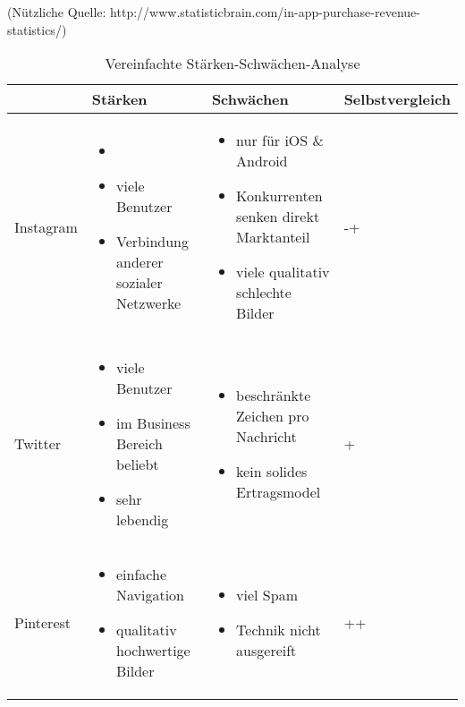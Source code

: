 (Nützliche Quelle: http://www.statisticbrain.com/in-app-purchase-revenue-statistics/)

\begin{center}
	\begin{table}[htbp!]
	\centering
		\begin{tabular}{| M{2cm} | M{5cm} | M{5cm} | M{3cm} |}
		\hline
			\textbf{ } & \textbf{Stärken} & \textbf{Schwächen} & \textbf{Selbstvergleich} \\ \hline
			Instagram 
			& \begin{itemize}
				\item[]
				\item viele Benutzer
				\item Verbindung anderer sozialer Netzwerke
			\end{itemize}
			& \begin{itemize}
				\item nur für iOS \& Android
				\item Konkurrenten senken direkt Marktanteil
				\item viele qualitativ schlechte Bilder
			\end{itemize} 
			& -+
			\\ \hline
			
			Twitter 
			& \begin{itemize}
				\item viele Benutzer
				\item im Business Bereich beliebt
				\item sehr lebendig
			\end{itemize}
			& \begin{itemize}
				\item beschränkte Zeichen pro Nachricht
				\item kein solides Ertragsmodel
			\end{itemize} 
			& +
			\\ \hline
			
			Pinterest 
			& \begin{itemize}
				\item einfache Navigation
				\item qualitativ hochwertige Bilder
			\end{itemize}
			& \begin{itemize}
				\item viel Spam
				\item Technik nicht ausgereift
			\end{itemize} 
			& ++
			\\ \hline
		\end{tabular}
		\caption{Vereinfachte Stärken-Schwächen-Analyse}
		\label{table:simpleSwot}
	\end{table}
\end{center}